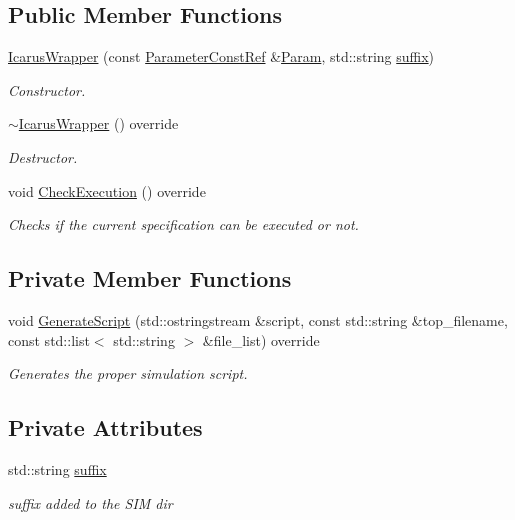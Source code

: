 \subsection*{Public Member Functions}
\begin{DoxyCompactItemize}
\item 
\hyperlink{classIcarusWrapper_a43e7335f0e3ae686711124555ea49b47}{Icarus\+Wrapper} (const \hyperlink{Parameter_8hpp_a37841774a6fcb479b597fdf8955eb4ea}{Parameter\+Const\+Ref} \&\hyperlink{classSimulationTool_adc409fd8f18901e2d0ea4a6ab6690138}{Param}, std\+::string \hyperlink{classIcarusWrapper_afbcc8662a0202ac922e161e6db2eecb7}{suffix})
\begin{DoxyCompactList}\small\item\em Constructor. \end{DoxyCompactList}\item 
\hyperlink{classIcarusWrapper_ab61d3d697f15b073e141fb2db6c8aba6}{$\sim$\+Icarus\+Wrapper} () override
\begin{DoxyCompactList}\small\item\em Destructor. \end{DoxyCompactList}\item 
void \hyperlink{classIcarusWrapper_a9ea8b4abaa701ca7faca32f40ff6c232}{Check\+Execution} () override
\begin{DoxyCompactList}\small\item\em Checks if the current specification can be executed or not. \end{DoxyCompactList}\end{DoxyCompactItemize}
\subsection*{Private Member Functions}
\begin{DoxyCompactItemize}
\item 
void \hyperlink{classIcarusWrapper_adf6d3591e5e20f081e89122563c04176}{Generate\+Script} (std\+::ostringstream \&script, const std\+::string \&top\+\_\+filename, const std\+::list$<$ std\+::string $>$ \&file\+\_\+list) override
\begin{DoxyCompactList}\small\item\em Generates the proper simulation script. \end{DoxyCompactList}\end{DoxyCompactItemize}
\subsection*{Private Attributes}
\begin{DoxyCompactItemize}
\item 
std\+::string \hyperlink{classIcarusWrapper_afbcc8662a0202ac922e161e6db2eecb7}{suffix}
\begin{DoxyCompactList}\small\item\em suffix added to the S\+IM dir \end{DoxyCompactList}\end{DoxyCompactItemize}
